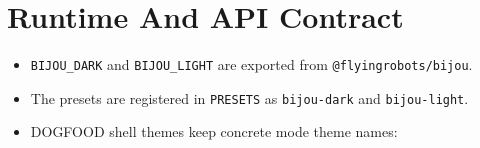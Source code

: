 \section{Runtime And API Contract}\label{record-179-runtime-and-api-contract}

\begin{itemize}
\tightlist
\item
  \texttt{B\allowbreak{}I\allowbreak{}J\allowbreak{}O\allowbreak{}U\allowbreak{}\_\allowbreak{}D\allowbreak{}A\allowbreak{}R\allowbreak{}K} and \texttt{B\allowbreak{}I\allowbreak{}J\allowbreak{}O\allowbreak{}U\allowbreak{}\_\allowbreak{}L\allowbreak{}I\allowbreak{}G\allowbreak{}H\allowbreak{}T} are exported from \texttt{@\allowbreak{}f\allowbreak{}l\allowbreak{}y\allowbreak{}i\allowbreak{}n\allowbreak{}g\allowbreak{}r\allowbreak{}o\allowbreak{}b\allowbreak{}o\allowbreak{}t\allowbreak{}s\allowbreak{}/\allowbreak{}b\allowbreak{}i\allowbreak{}j\allowbreak{}o\allowbreak{}u}.
\item
  The presets are registered in \texttt{P\allowbreak{}R\allowbreak{}E\allowbreak{}S\allowbreak{}E\allowbreak{}T\allowbreak{}S} as \texttt{b\allowbreak{}i\allowbreak{}j\allowbreak{}o\allowbreak{}u\allowbreak{}-\allowbreak{}d\allowbreak{}a\allowbreak{}r\allowbreak{}k} and \texttt{b\allowbreak{}i\allowbreak{}j\allowbreak{}o\allowbreak{}u\allowbreak{}-\allowbreak{}l\allowbreak{}i\allowbreak{}g\allowbreak{}h\allowbreak{}t}.
\item
  DOGFOOD shell themes keep concrete mode theme names:


\end{itemize}
